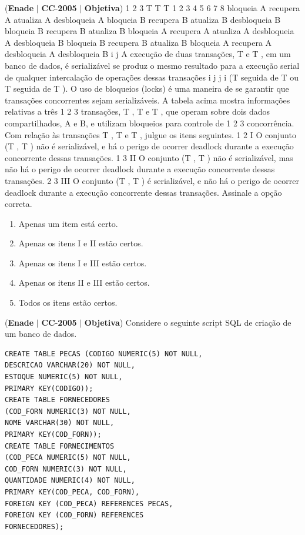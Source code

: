 \documentclass{exam}
\begin{document}
\begin{questions}
\question (\textbf{Enade} $|$ \textbf{CC}-\textbf{2005} $|$ \textbf{Objetiva})
1 2 3
T T T
1
2
3
4
5
6
7
8
bloqueia A
recupera A
atualiza A
desbloqueia A
bloqueia B
recupera B
atualiza B
desbloqueia B
bloqueia B
recupera B
atualiza B
bloqueia A
recupera A
atualiza A
desbloqueia A
desbloqueia B
bloqueia B
recupera B
atualiza B
bloqueia A
recupera A
desbloqueia A
desbloqueia B
i j
A execução de duas transações, T e T , em um banco de dados,
é serializável se produz o mesmo resultado para a execução serial
de qualquer intercalação de operações dessas transações
i j j i
(T seguida de T ou T seguida de T ). O uso de bloqueios (locks)
é uma maneira de se garantir que transações concorrentes sejam
serializáveis. A tabela acima mostra informações relativas a três
1 2 3
transações, T , T e T , que operam sobre dois dados
compartilhados, A e B, e utilizam bloqueios para controle de
1 2 3
concorrência. Com relação às transações T , T e T , julgue os
itens seguintes.
1 2
I O conjunto (T , T ) não é serializável, e há o perigo de
ocorrer deadlock durante a execução concorrente dessas
transações.
1 3
II O conjunto (T , T ) não é serializável, mas não há o perigo de
ocorrer deadlock durante a execução concorrente dessas
transações.
2 3
III O conjunto (T , T ) é serializável, e não há o perigo de
ocorrer deadlock durante a execução concorrente dessas
transações.
Assinale a opção correta.
	\begin{enumerate}[label=\alph*)]
		\item  Apenas um item está certo.
		\item  Apenas os itens I e II estão certos.
		\item  Apenas os itens I e III estão certos.
		\item  Apenas os itens II e III estão certos.
		\item  Todos os itens estão certos.
	\end{enumerate}

\question (\textbf{Enade} $|$ \textbf{CC}-\textbf{2005} $|$ \textbf{Objetiva})
Considere o seguinte script SQL de criação de um banco de
dados.
\begin{verbatim}
CREATE TABLE PECAS (CODIGO NUMERIC(5) NOT NULL,
DESCRICAO VARCHAR(20) NOT NULL,
ESTOQUE NUMERIC(5) NOT NULL,
PRIMARY KEY(CODIGO));
CREATE TABLE FORNECEDORES
(COD_FORN NUMERIC(3) NOT NULL,
NOME VARCHAR(30) NOT NULL,
PRIMARY KEY(COD_FORN));
CREATE TABLE FORNECIMENTOS
(COD_PECA NUMERIC(5) NOT NULL,
COD_FORN NUMERIC(3) NOT NULL,
QUANTIDADE NUMERIC(4) NOT NULL,
PRIMARY KEY(COD_PECA, COD_FORN),
FOREIGN KEY (COD_PECA) REFERENCES PECAS,
FOREIGN KEY (COD_FORN) REFERENCES
FORNECEDORES);
\end{verbatim} 



\end{questions}
\end{document}

